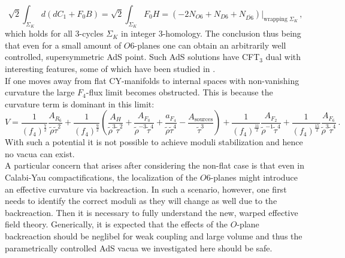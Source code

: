 \documentclass[12pt]{report}
\newcommand{\be}{\begin{equation}}
\newcommand{\ee}{\end{equation}}
\begin{document}
\be 
\sqrt{2} \int_{\Sigma_K} d \left(dC_1 + F_0 B\right) = \sqrt{2} \int_{\Sigma_K} F_0 H = (-2 N_{O6} + N_{D6} + N_{\overline{D6}})|_{\text{wrapping }\Sigma_K}\,,
\ee
which holds for all 3-cycles $\Sigma_K$ in integer 3-homology. The conclusion thus being that even for a small amount of $O6$-planes one can obtain an arbitrarily well controlled, supersymmetric AdS point. Such AdS solutions have CFT$_3$ dual with interesting features, some of which have been studied in \cite{Aharony:2008wz}.\\
If one moves away from flat CY-manifolds to internal spaces with non-vanishing curvature the large $F_4$-flux limit becomes obstructed. This is because the curvature term is dominant in this limit:
\be 
V = \frac{1}{(f_4)^ {\frac{7}{2}}} \frac{A_{R_6}}{\tilde{\rho} \tilde{\tau}^ 2} +\frac{1}{(f_4)^ {\frac{9}{2}}} \left( \frac{A_H}{\tilde{\rho}^3 \tilde{\tau}^ 2} + \frac{A_{F_0}}{\tilde{\rho}^ {-3}\tilde{\tau}^ 4} + \frac{a_{F_4}}{\tilde{\rho}\tilde{\tau}^ 4} - \frac{A_{\text{sources}}}{\tilde{\tau}^ 3} \right) + \frac{1}{(f_4)^ {\frac{11}{2}}} \frac{A_{F_2}}{\tilde{\rho}^ {-1}\tilde{\tau}^ 4} + \frac{1}{(f_4)^ {\frac{15}{2}}} \frac{A_{F_6}}{\tilde{\rho}^3\tilde{\tau}^ 4}\,.
\ee
With such a potential it is not possible to achieve moduli stabilization and hence no vacua can exist.\\
A particular concern that arises after considering the non-flat case is that even in Calabi-Yau compactifications, the localization of the $O6$-planes might introduce an effective curvature via backreaction. In such a scenario, however, one first needs to identify the correct moduli as they will change as well due to the backreaction. Then it is necessary to fully understand the new, warped effective field theory. Generically, it is expected that the effects of the $O$-plane backreaction should be neglibel for weak coupling and large volume and thus the parametrically controlled AdS vacua we investigated here should be safe. 
\end{document}

